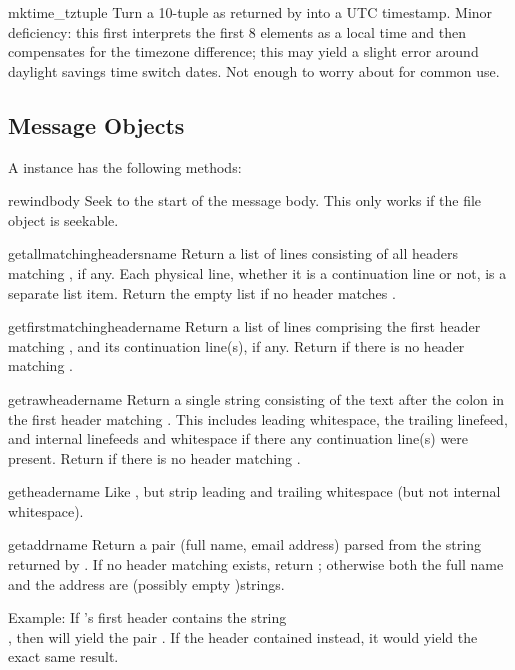 \begin{funcdesc}{mktime_tz}{tuple}
Turn a 10-tuple as returned by  into a UTC timestamp.
Minor deficiency: this first interprets the first 8 elements as a
local time and then compensates for the timezone difference;
this may yield a slight error around daylight savings time
switch dates.  Not enough to worry about for common use.
\end{funcdesc}

\subsection{Message Objects}

A  instance has the following methods:

\begin{funcdesc}{rewindbody}{}
Seek to the start of the message body.  This only works if the file
object is seekable.
\end{funcdesc}

\begin{funcdesc}{getallmatchingheaders}{name}
Return a list of lines consisting of all headers matching
, if any.  Each physical line, whether it is a continuation
line or not, is a separate list item.  Return the empty list if no
header matches .
\end{funcdesc}

\begin{funcdesc}{getfirstmatchingheader}{name}
Return a list of lines comprising the first header matching
, and its continuation line(s), if any.  Return 
if there is no header matching .
\end{funcdesc}

\begin{funcdesc}{getrawheader}{name}
Return a single string consisting of the text after the colon in the
first header matching .  This includes leading whitespace,
the trailing linefeed, and internal linefeeds and whitespace if there
any continuation line(s) were present.  Return  if there is
no header matching .
\end{funcdesc}

\begin{funcdesc}{getheader}{name}
Like , but strip leading and trailing
whitespace (but not internal whitespace).
\end{funcdesc}

\begin{funcdesc}{getaddr}{name}
Return a pair (full name, email address) parsed from the string
returned by .  If no header matching
 exists, return ; otherwise both the full
name and the address are (possibly empty )strings.

Example: If 's first  header contains the string\\
, then
 will yield the pair
.
If the header contained
 instead, it would yield the
exact same result.
\end{funcdesc}

